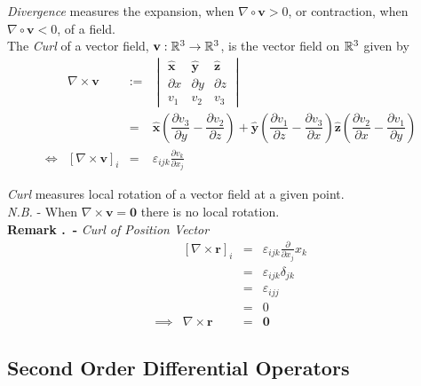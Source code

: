 \documentclass[11pt,a4paper]{article}
\begin{document}
\textit{Divergence} measures the expansion, when $\nabla\circ\textbf{v}>0$, or contraction, when $\nabla\circ\textbf{v}<0$, of a field.\\

The \textit{Curl} of a vector field, $\textbf{v}:\mathbb{R}^3\to\mathbb{R}^3$, is the vector field on $\mathbb{R}^3$ given by
\[\begin{array}{rrcl}
&\nabla\times\textbf{v}&:=&\begin{vmatrix}
\hat{\textbf{x}} & \hat{\textbf{y}} & \hat{\textbf{z}}\\
\partial x & \partial y & \partial z\\
v_1 & v_2 & v_3
\end{vmatrix}\\
&&=&\hat{\textbf{x}}\left(\dfrac{\partial v_3}{\partial y} - \dfrac{\partial v_2}{\partial z}\right) + \hat{\textbf{y}}\left(\dfrac{\partial v_1}{\partial z} - \dfrac{\partial v_3}{\partial x}\right) \hat{\textbf{z}}\left(\dfrac{\partial v_2}{\partial x} - \dfrac{\partial v_1}{\partial y}\right)\\
\Longleftrightarrow& [\nabla\times\textbf{v}]_i&=&\varepsilon_{ijk}\frac{\partial v_k}{\partial x_j}
\end{array}\]

\textit{Curl} measures local rotation of a vector field at a given point.\\
\textit{N.B.} - When $\nabla\times\textbf{v}=\textbf{0}$ there is no local rotation.\\

 \textbf{Remark .\ - }\textit{Curl of Position Vector}
\[\begin{array}{rrcl}
&[\nabla\times\textbf{r}]_i&=&\varepsilon_{ijk}\frac{\partial}{\partial x_j}x_k\\
&&=&\varepsilon_{ijk}\delta_{jk}\\
&&=&\varepsilon_{ijj}\\
&&=&0\\
\implies&\nabla\times\textbf{r}&=&\textbf{0}
\end{array}\]

\subsection{Second Order Differential Operators}
\end{document}

